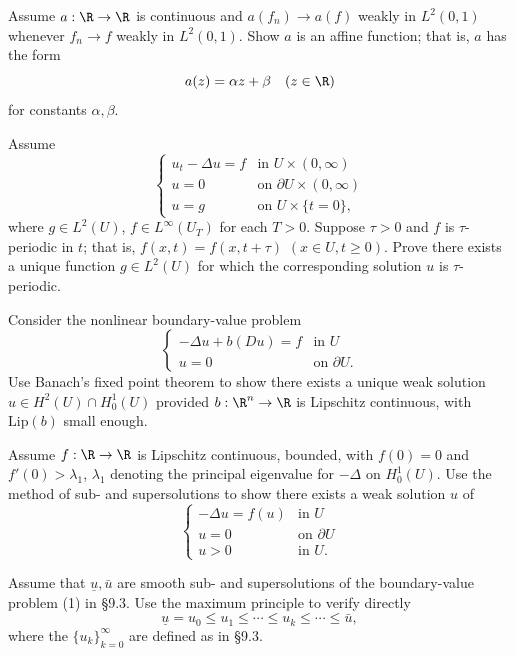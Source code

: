 \begin{exercise}
Assume $a : \R \to \R$ is continuous and $a(f_n) \to a(f)$ weakly in $L^2(0, 1)$ whenever $f_n \to f$ weakly in $L^2(0, 1)$. Show $a$ is an affine function; that is, $a$ has the form
\[
a(z) = \alpha z + \beta \quad (z \in \R)
\]
for constants $\alpha, \beta$.
\end{exercise}

\begin{exercise}
Assume
\[
\begin{cases} u_t - \Delta u = f & \text{in } U \times (0,\infty) \\ u = 0 & \text{on } \partial U \times (0,\infty) \\ u = g & \text{on } U \times \{t = 0\}, \end{cases}
\]
where $g \in L^2(U)$, $f \in L^\infty(U_T)$ for each $T > 0$. Suppose $\tau > 0$ and $f$ is $\tau$-periodic in $t$; that is, $f(x, t) = f(x, t + \tau)$ $(x \in U, t \geq 0)$. Prove there exists a unique function $g \in L^2(U)$ for which the corresponding solution $u$ is $\tau$-periodic.
\end{exercise}

\begin{exercise}
Consider the nonlinear boundary-value problem
\[
\begin{cases}
-\Delta u + b(Du) = f & \text{in } U \\
u = 0 & \text{on } \partial U.
\end{cases}
\]
Use Banach's fixed point theorem to show there exists a unique weak solution $u \in H^2(U) \cap H^1_0(U)$ provided $b : \R^n \to \R$ is Lipschitz continuous, with $\text{Lip}(b)$ small enough.
\end{exercise}

\begin{exercise}
Assume $f : \R \to \R$ is Lipschitz continuous, bounded, with $f(0) = 0$ and $f'(0) > \lambda_1$, $\lambda_1$ denoting the principal eigenvalue for $-\Delta$ on $H^1_0(U)$. Use the method of sub- and supersolutions to show there exists a weak solution $u$ of
\[
\begin{cases}
-\Delta u = f(u) & \text{in } U \\
u = 0 & \text{on } \partial U \\
u > 0 & \text{in } U.
\end{cases}
\]
\end{exercise}

\begin{exercise}
Assume that $\underline{u}, \bar{u}$ are smooth sub- and supersolutions of the boundary-value problem (1) in \S9.3. Use the maximum principle to verify directly
\[
\underline{u} = u_0 \le u_1 \le \cdots \le u_k \le \cdots \le \bar{u},
\]
where the $\{u_k\}_{k=0}^{\infty}$ are defined as in \S9.3.
\end{exercise}

